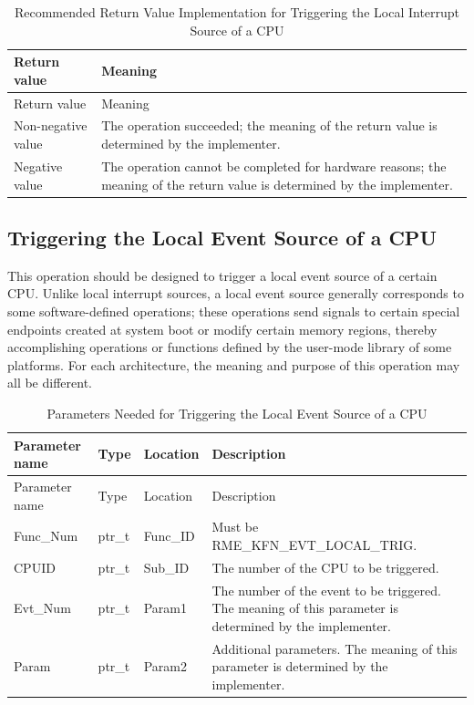 \begin{xltabular}{\textwidth}{@{}>{\hsize\raggedright\arraybackslash}X>{\hsize\raggedright\arraybackslash}X@{}}
\caption{Recommended Return Value Implementation for Triggering the Local Interrupt Source of a CPU}\label{tab:8-21-trigger-local-interrupt-source-suggested-return-values}\\
\toprule
Return value & Meaning\tabularnewline
\endfirsthead
\toprule
Return value & Meaning\tabularnewline
\midrule
\endhead
\bottomrule
\endlastfoot
    Non-negative value & The operation succeeded; the meaning of the return value is determined by the implementer.\tabularnewline
    Negative value & The operation cannot be completed for hardware reasons; the meaning of the return value is determined by the implementer.\tabularnewline
\end{xltabular}
\nopagebreak[4]

\subsection{Triggering the Local Event Source of a CPU}\label{subsec:8-trigger-local-event-source}

This operation should be designed to trigger a local event source of a certain CPU. Unlike local interrupt sources, a local event source generally corresponds to some software-defined operations; these operations send signals to certain special endpoints created at system boot or modify certain memory regions, thereby accomplishing operations or functions defined by the user-mode library of some platforms. For each architecture, the meaning and purpose of this operation may all be different.

\begin{xltabular}{\textwidth}{@{}>{\hsize\raggedright\arraybackslash}X>{\hsize\raggedright\arraybackslash}X>{\hsize\raggedright\arraybackslash}X>{\hsize\raggedright\arraybackslash}X@{}}
\caption{Parameters Needed for Triggering the Local Event Source of a CPU}\label{tab:8-22-trigger-local-event-source-parameters}\\
\toprule
Parameter name & Type & Location & Description\tabularnewline
\endfirsthead
\toprule
Parameter name & Type & Location & Description\tabularnewline
\midrule
\endhead
\bottomrule
\endlastfoot
Func\_Num & ptr\_t & Func\_ID &
Must be RME\_KFN\_EVT\_LOCAL\_TRIG.\tabularnewline
CPUID & ptr\_t & Sub\_ID & The number of the CPU to be triggered.\tabularnewline
Evt\_Num & ptr\_t & Param1 &
The number of the event to be triggered. The meaning of this parameter is determined by the implementer.\tabularnewline
Param & ptr\_t & Param2 &
Additional parameters. The meaning of this parameter is determined by the implementer.\tabularnewline
\end{xltabular}
\nopagebreak[4]

